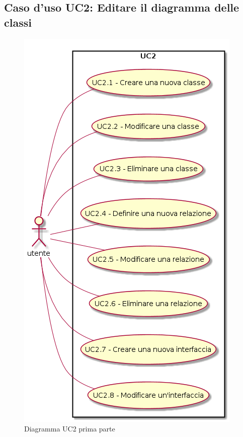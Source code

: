 \documentclass[../AnalisiDeiRequisiti.tex]{subfiles}
\begin{document}
	\subsection{Caso d'uso UC2: Editare il diagramma delle classi}
	\begin{figure} [H]
		\centering
		\includegraphics[scale=0.45]{./Figures/UC2parte1.png}
		\caption{Diagramma UC2 prima parte}\label{}
	\end{figure}
\end{document}
